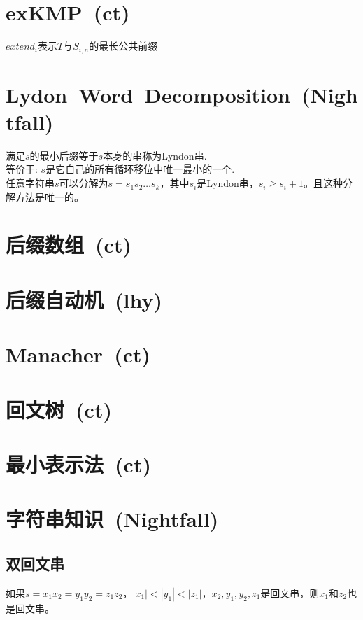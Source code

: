 \section{exKMP\ \small(ct)}
    $ extend_i $表示$ T $与$ S_{i,n} $的最长公共前缀
\section{Lydon\ Word\ Decomposition\ \small(Nightfall)}
    满足$ s $的最小后缀等于$ s $本身的串称为Lyndon串.
    \\等价于: $ s $是它自己的所有循环移位中唯一最小的一个.
    \\任意字符串$ s $可以分解为$ s = \overline{s_1 s_2 \dots s_k} $，其中$ s_i $是Lyndon串，$ s_i \geq s_i + 1 $。且这种分解方法是唯一的。
\section{后缀数组\ \small(ct)}
\section{后缀自动机\ \small(lhy)}
\section{Manacher\ \small(ct)}
\section{回文树\ \small(ct)}
\section{最小表示法\ \small(ct)}
\section{字符串知识\ \small(Nightfall)}
    \subsection*{双回文串}
        如果$ s = x_1 x_2 = y_1 y_2 = z_1 z_2 $，$ \left|x_1\right| < \left|y_1\right| < \left|z_1\right| $，$ x_2, y_1, y_2, z_1 $是回文串，则$ x_1 $和$ z_2 $也是回文串。
